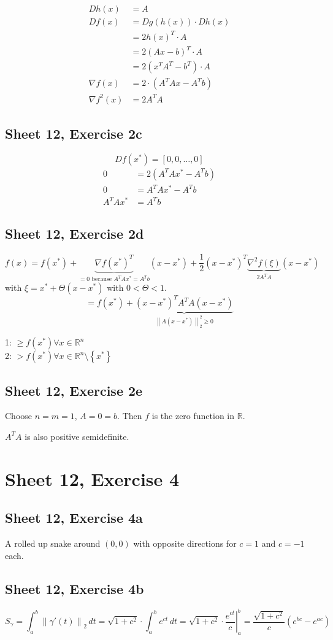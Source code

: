 \documentclass{article}
\newcommand{\set}[1]{\left\{#1\right\}}
\newcommand{\norm}[1]{\left\|#1\right\|}
\begin{document}
\begin{align*}
  Dh(x) &= A \\
  Df(x) &= Dg(h(x)) \cdot Dh(x) \\
    &= 2h(x)^T \cdot A \\
    &= 2(Ax - b)^T \cdot A \\
    &= 2(x^T A^T - b^T) \cdot A \\
  \nabla f(x) &= 2 \cdot \left(A^T A x - A^T b\right) \\
  \nabla f^2(x) &= 2A^T A
\end{align*}

\subsection{Sheet 12, Exercise 2c}

\[ D f(x^*) = [0, 0, \dots, 0] \]
\begin{align*}
  0 &= 2 (A^T Ax^* - A^T b) \\
  0 &= A^T Ax^* - A^T b \\
  A^T Ax^* &= A^T b
\end{align*}

\subsection{Sheet 12, Exercise 2d}

\[ f(x) = f(x^*) + \underbrace{\nabla f(x^*)^T}_{=0 \text{ because } A^T Ax^* = A^T b} (x - x^*) + \frac12 (x - x^*)^T \underbrace{\nabla^2 f(\xi)}_{2A^TA} (x - x^*) \]
with $\xi = x^* + \Theta(x - x^*)$ with $0 < \Theta < 1$.
\[ = f(x^*) + \underbrace{(x - x^*)^T A^T A (x - x^*)}_{\norm{A(x - x^*)}_2^2 \geq 0} \]

1: $\geq f(x^*) \forall x \in \mathbb R^n$ \\
2: $> f(x^*) \forall x \in \mathbb R^n \setminus \set{x^*}$

\subsection{Sheet 12, Exercise 2e}
Choose $n = m = 1$, $A = 0 = b$.
Then $f$ is the zero function in $\mathbb R$.

$A^T A$ is also positive semidefinite.

\section{Sheet 12, Exercise 4}
\subsection{Sheet 12, Exercise 4a}
A rolled up snake around $(0, 0)$ with opposite directions for $c=1$ and $c=-1$ each.

\subsection{Sheet 12, Exercise 4b}
\[ S_\gamma = \int_a^b \norm{\gamma'(t)}_2 \, dt = \sqrt{1 + c^2} \cdot \int_a^b e^{ct} \, dt = \sqrt{1 + c^2} \cdot \left.\frac{e^{ct}}{c}\right|_a^b = \frac{\sqrt{1 + c^2}}{c} (e^{bc} - e^{ac})\]
\end{document}
